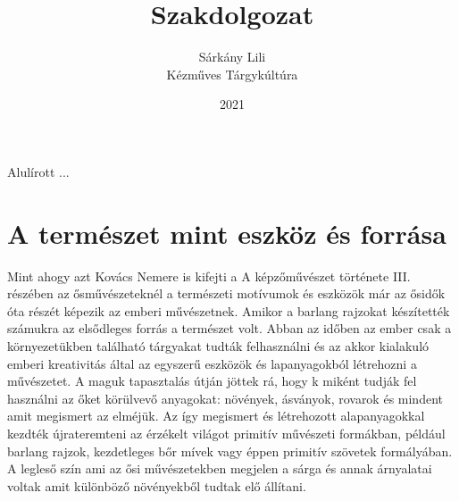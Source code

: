 \documentclass[fontsize=12pt, appendixprefix=true]{scrreprt}
\author{Sárkány Lili\\Kézműves Tárgykúltúra}
\title{Szakdolgozat}
\date{2021}
\newcommand{\pushtobottom}{\vspace*{\fill}}
\newcommand{\signatureline}[1]{\begin{flushright}
	\vspace*{.5cm}\par\noindent\makebox[2.5in]{\hrulefill}
	\par\noindent\makebox[2.5in][c]{#1}
	\end{flushright}
}
\begin{document}
\maketitle

Alulírott ...
\pushtobottom
\signatureline{Aláírás}

\tableofcontents

\chapter{A természet mint eszköz és forrása}
Mint ahogy azt Kovács Nemere is kifejti a A képzőművészet története III. részében az ősművészeteknél \cite{nemerekepzHomHuveszet} a természeti motívumok és eszközök már az ősidők óta részét képezik az emberi művészetnek. Amikor a barlang rajzokat készítették számukra
az elsődleges forrás a természet volt.
Abban az időben az ember csak a környezetükben található tárgyakat tudták felhasználni és az akkor kialakuló emberi kreativitás által az egyszerű eszközök és lapanyagokból létrehozni a művészetet. A maguk tapasztalás útján jöttek rá, hogy  k miként tudják fel használni az őket körülvevő anyagokat: növények, ásványok, rovarok és mindent amit megismert az elméjük. Az így megismert és létrehozott alapanyagokkal kezdték újrateremteni az érzékelt világot primitív művészeti formákban, például barlang rajzok, kezdetleges bőr mívek vagy éppen primitív szövetek formályában. A legleső szín ami az ősi művészetekben megjelen a sárga és annak árnyalatai voltak amit különböző növényekből tudtak elő állítani.
\end{document}
